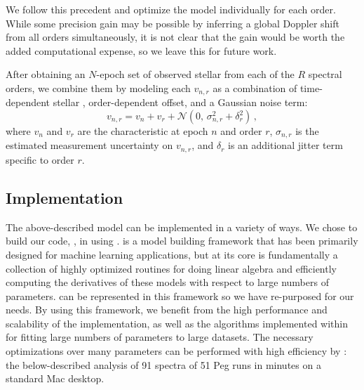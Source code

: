 \documentclass[modern]{aastex62}
\begin{document}
We follow this precedent and optimize the \wobble model individually for each order.
While some \RV precision gain may be possible by inferring a global Doppler shift from all orders simultaneously, it is not clear that the gain would be worth the added computational expense, so we leave this for future work.

After obtaining an $N$-epoch set of observed stellar \RVs from each of the $R$ spectral orders, we combine them by modeling each \RV $v_{n,r}$ as a combination of time-dependent stellar \RV, order-dependent \RV offset, and a Gaussian noise term:
\begin{equation}
v_{n,r} = v_n + v_r + \mathcal{N}(0,\,\sigma_{n,r}^{2} + \delta_r^2 )\,,
\end{equation}
where $v_n$ and $v_r$ are the characteristic \RVs at epoch $n$ and order $r$, $\sigma_{n,r}$ is the estimated measurement uncertainty on $v_{n,r}$, and $\delta_r$ is an additional jitter term specific to order $r$.


\subsection{Implementation}
\label{s:implementation}

The above-described model can be implemented in a variety of ways. We chose to build our code, \wobble, in  using \TF.
\TF is a model building framework that has been primarily designed for machine
learning applications, but at its core \TF is fundamentally a collection of
highly optimized routines for doing linear algebra and efficiently computing the
derivatives of these models with respect to large numbers of parameters.
\wobble can be represented in this framework so we have re-purposed \TF for our
needs.
By using this framework, we benefit from the high performance and scalability
of the implementation, as well as the algorithms implemented within \TF for
fitting large numbers of parameters to large datasets.
The necessary optimizations over many parameters can be performed with high efficiency by \TF: the below-described analysis of 91 spectra of 51 Peg runs in  minutes on a standard Mac desktop.
\end{document}

